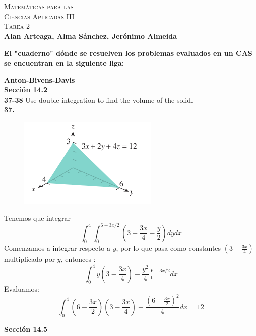 \documentclass[11pt]{report}
\begin{document}
\newcommand{\BP}[1]{\bigg( #1 \bigg)} %
\newcommand{\Bp}[1]{\Big( #1 \Big)} %
\newcommand{\bp}[1]{\big( #1 \big)} %

\newcommand{\tsint}[1]{\int_0^{#1}} %

\begin{center}
		\textsc{\huge Matemáticas para las \\Ciencias Aplicadas III \\ Tarea 2\\}
		\textbf{Alan Arteaga, Alma Sánchez, Jerónimo Almeida}
\end{center}

\textbf{El "cuaderno" dónde se resuelven los problemas evaluados en un CAS se encuentran
		en la siguiente liga: }

\textbf{Anton-Bivens-Davis} \\

\textbf{Sección 14.2} \\

\textbf{37-38} Use double integration to find the volume of the solid. \\

\textbf{37.} \\

\begin{figure}[h]
\includegraphics[scale=0.5]{img1.png}
\centering
\end{figure}

Tenemos que integrar
\[\int_0^4 \int_0^{6-3x/2}\left( 3- \frac{3x}{4}- \frac{y}{2} \right) dy dx\]
Comenzamos a integrar respecto a $y$, por lo que pasa como constantes $(3- \frac{3x}{4})$ multiplicado por $y$, entonces :
\[\int_0^4 y \left( 3- \frac{3x}{4}\right)- \frac{y^2}{4} \vert_0^{6-3x/2} dx\]
Evaluamos:
\[\int_0^4 \left(6 - \frac{3x}{2} \right)\left( 3- \frac{3x}{4}\right)- \frac{\left(6 - \frac{3x}{2} \right)^2}{4} dx = 12\]

\textbf{Sección 14.5} \\
\end{document}
